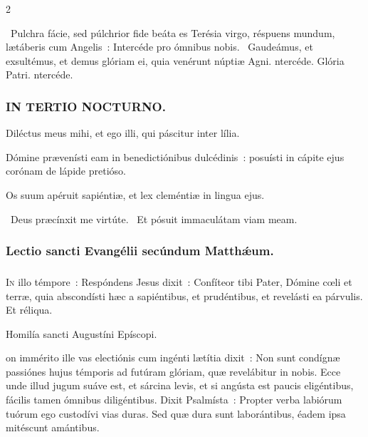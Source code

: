 \documentclass[9pt,twoside]{extarticle}
\begin{document}
\begin{multicols}{2}
{\begin{tightlist}{}
\item {}~Pulchra fácie, sed púlchrior fide beáta es Terésia virgo, réspuens mundum, lætáberis cum Angelis~: \textred{*} Intercéde pro ómnibus nobis. ~Gaudeámus, et exsultémus, et demus glóriam ei, quia venérunt núptiæ Agni. ntercéde. Glória Patri. ntercéde.
\end{tightlist}

\subsubsection*{\center \textsc{IN TERTIO NOCTURNO.}}
\begin{tightlist}{}
\item {} Diléctus meus mihi, et ego illi, qui páscitur inter lília.
\item {} Dómine prævenísti eam in benedictiónibus dulcédinis~: posuísti in cápite ejus corónam de lápide pretióso.
\item {} Os suum apéruit sapiéntiæ, et lex cleméntiæ in lingua ejus. 
\item {}~Deus præcínxit me virtúte. ~Et pósuit immaculátam viam meam.
\end{tightlist}

\subsubsection*{\center Lectio sancti Evangélii secúndum Matthǽum.}
\subsubsection*{\center {}}
\lettrine{I}n illo témpore~: Respóndens Jesus dixit~: Confíteor tibi Pater, Dómine cœli et terræ, quia abscondísti hæc a sapiéntibus, et prudéntibus, et revelásti ea párvulis. Et réliqua.

\begin{center}Homilía sancti Augustíni Epíscopi.\\
\end{center}
on immérito ille vas electiónis cum ingénti lætítia dixit~: Non sunt condígnæ passiónes hujus témporis ad futúram glóriam, quæ revelábitur in nobis. Ecce unde illud jugum suáve est, et sárcina levis, et si angústa est paucis eligéntibus, fácilis tamen ómnibus diligéntibus. Dixit Psalmísta~: Propter verba labiórum tuórum ego custodívi vias duras. Sed quæ dura sunt laborántibus, éadem ipsa mitéscunt amántibus.

}
\end{multicols}
\end{document}

